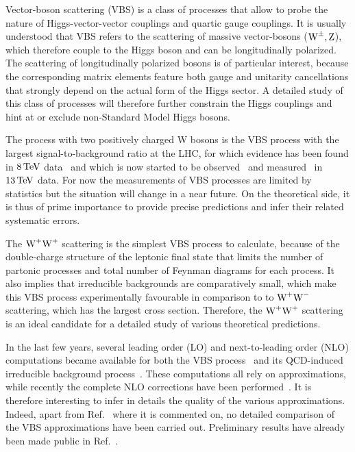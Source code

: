 Vector-boson scattering (VBS) is a class of processes that allow to probe the nature of Higgs-vector-vector couplings and quartic gauge couplings.
It is usually understood that VBS refers to the scattering of massive vector-bosons ($\text{W}^\pm,\text{Z}$), which therefore couple to the Higgs boson and can be longitudinally polarized.
The scattering of longitudinally polarized bosons is of particular interest, because the corresponding matrix elements feature both gauge and unitarity cancellations that strongly depend on the actual form of the Higgs sector.
A detailed study of this class of processes will therefore further constrain the Higgs couplings and hint at or exclude non-Standard Model Higgs bosons.

The process with two positively charged W bosons is the VBS process with the largest signal-to-background ratio at the LHC, for which evidence has been found in $8 \,\text{TeV}$ data~\cite{Aad:2014zda,Khachatryan:2014sta} and which is now started to be observed~\cite{Sirunyan:2017ret} and measured~\cite{Aaboud:2016ffv} in $13\,\text{TeV}$ data.
For now the measurements of VBS processes are limited by statistics but the situation will change in a near future.
On the theoretical side, it is thus of prime importance to provide precise predictions and infer their related systematic errors.

The $\text{W}^+\text{W}^+$ scattering is the simplest VBS process to calculate, because of the double-charge structure of the leptonic final state that limits the number of partonic processes and total number of Feynman diagrams for each process.
It also implies that irreducible backgrounds are comparatively small, which make this VBS process experimentally favourable in comparison to \eg to $\text{W}^+\text{W}^-$ scattering, which has the largest cross section.
Therefore, the $\text{W}^+\text{W}^+$ scattering is an ideal candidate for a detailed study of various theoretical predictions.

In the last few years, several leading order (LO) and next-to-leading order (NLO) computations became available for both the VBS process~\cite{Jager:2009xx,Jager:2011ms,Denner:2012dz,Rauch:2016pai} and its QCD-induced irreducible background process~\cite{Rauch:2016pai,Melia:2010bm,Melia:2011gk,Campanario:2013gea,Baglio:2014uba}.
These computations all rely on approximations, while recently the complete NLO corrections have been performed~\cite{Biedermann:2017bss}.
It is therefore interesting to infer in details the quality of the various approximations.
Indeed, apart from Ref.~\cite{Biedermann:2017bss} where it is commented on,  no detailed comparison of the VBS approximations have been carried out.
Preliminary results have already been made public in Ref.~\cite{Anders:2018gfr}.

